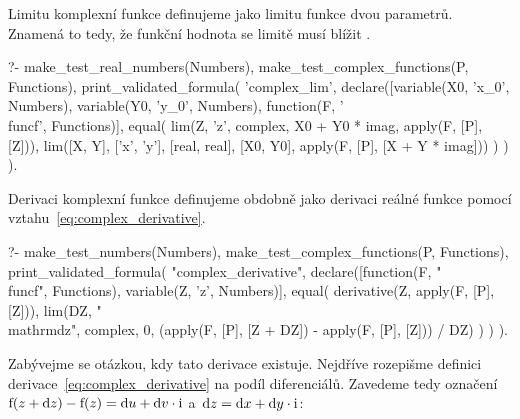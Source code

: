 Limitu komplexní funkce definujeme jako limitu funkce dvou parametrů. Znamená to tedy, že funkční hodnota se limitě musí blížit .

\begin{prolog}
?-	make_test_real_numbers(Numbers),
	make_test_complex_functions(P, Functions),
	print_validated_formula(
		'complex_lim',
		declare([variable(X0, 'x_0', Numbers), variable(Y0, 'y_0', Numbers), function(F, '\\func{f}', Functions)],
			equal(
				lim(Z, 'z', complex, X0 + Y0 * imag, apply(F, [P], [Z])),
				lim([X, Y], ['x', 'y'], [real, real], [X0, Y0], apply(F, [P], [X + Y * imag]))
			)
		)
	).
\end{prolog}

Derivaci komplexní funkce definujeme obdobně jako derivaci reálné funkce pomocí vztahu~\eqref{eq:complex_derivative}.

\begin{prolog}
?-	make_test_numbers(Numbers),
	make_test_complex_functions(P, Functions),
	print_validated_formula(
		"complex_derivative",
		declare([function(F, "\\func{f}", Functions), variable(Z, 'z', Numbers)],
			equal(
				derivative(Z, apply(F, [P], [Z])),
				lim(DZ, "\\mathrm{d}z", complex, 0, (apply(F, [P], [Z + DZ]) - apply(F, [P], [Z])) / DZ)
			)
		)
	).
\end{prolog}

Zabývejme se otázkou, kdy tato derivace existuje. Nejdříve rozepišme definici derivace~\eqref{eq:complex_derivative} na podíl diferenciálů. Zavedeme tedy označení \(\mathrm{f}(z + \mathrm{d}z) - \mathrm{f}(z) = \mathrm{d}u + \mathrm{d}v \cdot \mathrm{i}\) a~\(\mathrm{d}z = \mathrm{d}x + \mathrm{d}y \cdot \mathrm{i}\):


